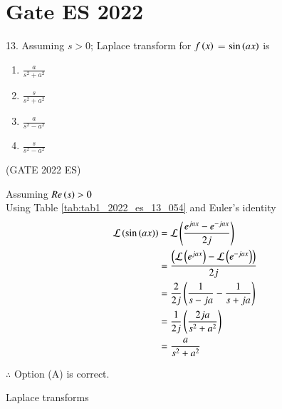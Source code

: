 \documentclass[journal,12pt,twocolumn]{IEEEtran}
\begin{document}


\vspace{3cm}

\title{}
\author{EE23BTECH11054 -  Sai Krishna Shanigarapu$^{*}$
}
\maketitle
\newpage
\bigskip


\section*{Gate ES 2022}
13. \hspace{2pt}Assuming $s>0$; Laplace transform for $f\left(x\right)$ = $\sin\left(ax\right)$ is\\
\begin{enumerate}[label=(\Alph*)]
    \item $\frac{a}{s^2+a^2}$\\
    \item $\frac{s}{s^2 + a^2}$\\
    \item $\frac{a}{s^2-a^2}$\\
    \item $\frac{s}{s^2-a^2}$
\end{enumerate}
\hfill(GATE 2022 ES)

\solution
\fi
Assuming $Re\left(s\right)>0$\\
Using Table \ref{tab:tab1_2022_es_13_054} and Euler's identity\\
    \begin{align}
        \mathcal{L}\left(\sin\left(ax\right)\right) &= \mathcal{L}\left(\frac{e^{jax} - e^{-jax}}{2j}\right)\\
        &= \frac{\left(\mathcal{L}\left(e^{jax}\right) - \mathcal{L}\left(e^{-jax}\right)\right)}{2j}\\
        &= \frac{2}{2j}\left(\frac{1}{s-ja}-\frac{1}{s+ja}\right)\\
        &= \frac{1}{2j}\left(\frac{2ja}{s^2 + a^2}\right)\\
        &= \frac{a}{s^2 + a^2}
    \end{align}
\bigskip
    

$\therefore$ Option (A) is correct.

\begin{table}[ht]
       
    \caption{Laplace transforms}
    \label{tab:tab1_2022_es_13_054}
\end{table}
\end{document}

